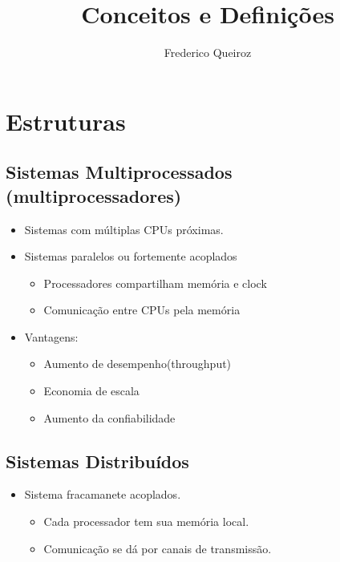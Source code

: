 \documentclass[a4paper, 11pt]{article}
\author{Frederico Queiroz}
\title{Conceitos e Definições}
\begin{document}
\maketitle

\section{Estruturas}

\subsection{Sistemas Multiprocessados (multiprocessadores)}
\begin{itemize}
    \item Sistemas com múltiplas CPUs próximas.
    \item Sistemas paralelos ou fortemente acoplados
    \begin{itemize}
        \item Processadores compartilham memória e clock
        \item Comunicação entre CPUs pela memória
    \end{itemize}
    \item Vantagens:
    \begin{itemize}
        \item Aumento de desempenho(throughput)
        \item Economia de escala
        \item Aumento da confiabilidade
    \end{itemize}
\end{itemize}

\subsection{Sistemas Distribuídos}
\begin{itemize}
    \item Sistema fracamanete acoplados.
    \begin{itemize}
        \item Cada processador tem sua memória local.
        \item Comunicação se dá por canais de transmissão.
    \end{itemize}
\end{itemize}
\end{document}
